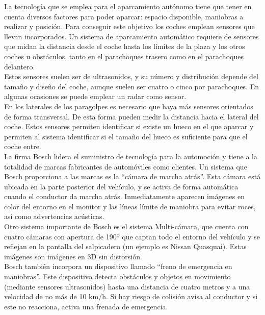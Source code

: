 La tecnología que se emplea para el aparcamiento autónomo tiene que tener en cuenta diversos factores para poder aparcar: espacio disponible, maniobras a realizar y posición. Para conseguir este objetivo los coches emplean sensores que llevan incorporados. Un sistema de aparcamiento automático requiere de sensores que midan la distancia desde el coche hasta los límites de la plaza y los otros coches u obstáculos, tanto en el parachoques trasero como en el parachoques delantero.\\

Estos sensores suelen ser de ultrasonidos, y su número y distribución depende del tamaño y diseño del coche, aunque suelen ser cuatro o cinco por parachoques. En algunas ocasiones se puede emplear un radar como sensor.\\

En los laterales de los paragolpes es necesario que haya más sensores orientados de forma transversal. De esta forma pueden medir la distancia hacia el lateral del coche. Estos sensores permiten identificar si existe un hueco en el que aparcar y permiten al sistema identificar si el tamaño del hueco es suficiente para que el coche entre.\\

La firma Bosch lidera el suministro de tecnología para la automoción y tiene a la totalidad de marcas fabricantes de automóviles como clientes. Un sistema que Bosch proporciona a las marcas es la ``cámara de marcha atrás''. Esta cámara está ubicada en la parte posterior del vehículo, y se activa de forma automática cuando el conductor da marcha atrás. Inmediatamente aparecen imágenes en color del entorno en el monitor y las líneas límite de maniobra para evitar roces, así como advertencias acústicas.\\

Otro sistema importante de Bosch es el sistema Multi-cámara, que cuenta con cuatro cámaras con apertura de 190º que captan todo el entorno del vehículo y se reflejan en la pantalla del salpicadero (un ejemplo es Nissan Quasquai). Estas imágenes son imágenes en 3D sin distorsión.\\

Bosch también incorpora un dispositivo llamado ``freno de emergencia en maniobras''. Este dispositivo detecta obstáculos y objetos en movimiento (mediante sensores ultrasonidos) hasta una distancia de cuatro metros y a una velocidad de no más de 10 km/h. Si hay riesgo de colisión avisa al conductor y si este no reacciona, activa una frenada de emergencia.\\

